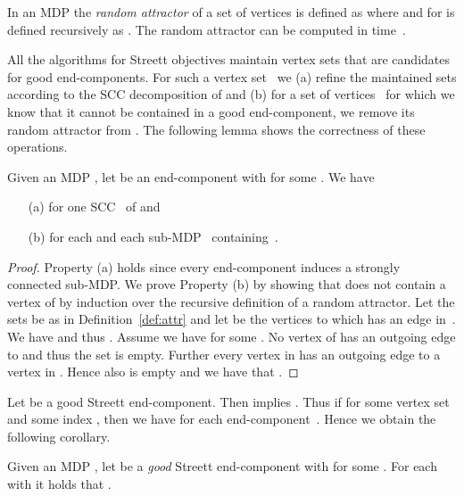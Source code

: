 \documentclass[11pt,letterpaper]{article}
\newcommand{\lu}{\textup{(}}
\newcommand{\ru}{\textup{)}\xspace}
\newcommand{\upbr}[1]{\lu #1\ru}
\begin{document}
\begin{definition}\label{def:attr}
In an MDP  
the \emph{random attractor}  of a set of vertices 
 is defined as  where  and 
 for  is defined recursively as .
The random attractor  can be computed in  time~\cite{Beeri80,Immerman81}.
\end{definition}

All the algorithms for Streett objectives maintain vertex sets that are 
candidates for good end-components. For such a vertex set~ we (a) 
refine the maintained sets according to the SCC decomposition of 
and (b) for a set of vertices~ for which we know that it cannot be contained 
in a good end-component, we remove its random attractor from . The following lemma 
shows the correctness of these operations.

\begin{lemma}\label{lem:eccontained}
	Given an MDP , let  be an end-component with  for 
	some . 
	We have 
	
	\begin{itemize}
	 \item[\upbr{a}] for one SCC~ of  and
	 
	 \item[\upbr{b}]  for each 
			 and each sub-MDP~ containing~.
	\end{itemize}
\end{lemma}

\begin{proof}
	Property \upbr{a} holds since every end-component induces a strongly connected
	sub-MDP. We prove Property \upbr{b} by showing that 
	does not contain a vertex of  by induction over the recursive 
	definition of a random attractor. Let the sets  be as in
	Definition~\ref{def:attr} and let  be the vertices to which  has an 
	edge in~. 
	We have  and thus .
	Assume we have  for some . No vertex of
	 has an outgoing edge to  and thus the set 
	 is empty.
	Further every vertex in  has an outgoing edge to a vertex in .
	Hence also  is empty
	and we have that .
\end{proof}

Let  be a good Streett end-component. Then  implies 
. Thus if  for some vertex 
set  and some index , then we have  
for each end-component~. Hence we obtain the 
following corollary.

\begin{corollary}\label{cor:geccontained}
Given an MDP , let  be a \emph{good} Streett end-component with 
 for some . 
For each  with  it holds that 
.
\end{corollary}
\end{document}
